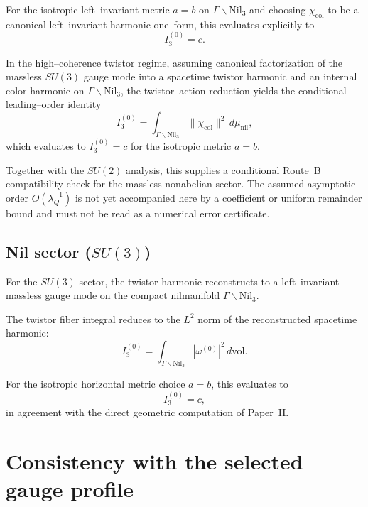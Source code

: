 \documentclass[11pt]{article}
\begin{document}
For the isotropic left--invariant metric $a=b$ on
$\Gamma\backslash\mathrm{Nil}_3$ and choosing $\chi_{\mathrm{col}}$ to be a
canonical left--invariant harmonic one--form, this evaluates explicitly to
\begin{equation}
I_3^{(0)} = c.
\label{eq:SU3_overlap_value}
\end{equation}

\begin{theorem}
In the high--coherence twistor regime, assuming canonical factorization of the
massless $SU(3)$ gauge mode into a spacetime twistor harmonic and an internal
color harmonic on $\Gamma\backslash\mathrm{Nil}_3$, the twistor--action
reduction yields the conditional leading--order identity
\[
I_3^{(0)}
=
\int_{\Gamma\backslash\mathrm{Nil}_3}
\|\chi_{\mathrm{col}}\|^2\, d\mu_{\mathrm{nil}},
\]
which evaluates to $I_3^{(0)}=c$ for the isotropic metric $a=b$.
\end{theorem}

\begin{remark}
Together with the $SU(2)$ analysis, this supplies a conditional Route~B
compatibility check for the massless nonabelian sector. The assumed asymptotic
order $O(\lambda_Q^{-1})$ is not yet accompanied here by a coefficient or
uniform remainder bound and must not be read as a numerical error certificate.
\end{remark}


\subsection{Nil sector ($SU(3)$)}

For the $SU(3)$ sector, the twistor harmonic reconstructs to a left--invariant
massless gauge mode on the compact nilmanifold
$\Gamma\backslash\mathrm{Nil}_3$.

The twistor fiber integral reduces to the $L^2$ norm of the reconstructed
spacetime harmonic:
\[
I_3^{(0)} = \int_{\Gamma\backslash\mathrm{Nil}_3}
|\omega^{(0)}|^2\,d\mathrm{vol}.
\]

For the isotropic horizontal metric choice $a=b$, this evaluates to
\[
I_3^{(0)} = c,
\]
in agreement with the direct geometric computation of Paper~II.

\section{Consistency with the selected gauge profile}
\end{document}
